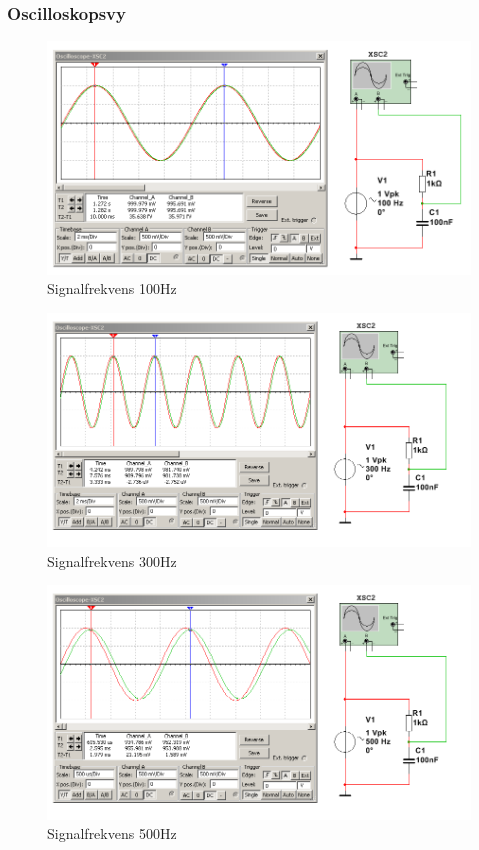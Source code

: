 \documentclass[11pt,a4paper]{article}
\begin{document}
\subsubsection{Oscilloskopsvy}
\begin{figure}[H]
    \centering
    \includegraphics[scale=0.5]{ee466multisim/5-100Hz.png}
    \caption{Signalfrekvens 100Hz}
    \label{fig:sim-5-100Hz}
\end{figure}

\begin{figure}[H]
    \centering
    \includegraphics[scale=0.5]{ee466multisim/5-300Hz.png}
    \caption{Signalfrekvens 300Hz}
    \label{fig:sim-5-300Hz}
\end{figure}

\begin{figure}[H]
    \centering
    \includegraphics[scale=0.5]{ee466multisim/5-500Hz.png}
    \caption{Signalfrekvens 500Hz}
    \label{fig:sim-5-500Hz}
\end{figure}
\end{document}
